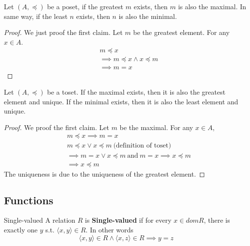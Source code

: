 \begin{proposition}{}{}
    Let $(A,\preceq)$ be a poset, if the greatest $m$ exists, then $m$
    is also the maximal. In same way, if the least $n$ exists, then $n$
    is also the minimal.
\end{proposition}

\begin{proof}
    We just proof the first claim. Let $m$ be the greatest element.
    For any $x \in A$.
    \begin{align*}
        &m \preceq x\\
        &\implies m \preceq x \land x \preceq m\\
        &\implies m = x
    \end{align*}
\end{proof}

\begin{theorem}{}{}
    Let $(A,\preceq)$ be a toset. If the maximal exists, then it is
    also the greatest element and unique.
    If the minimal exists, then it is also the least element and unique.
\end{theorem}

\begin{proof}
    We proof the first claim. Let $m$ be the maximal. For any $x \in A$,
    \begin{align*}
        &m \preceq x \implies m = x\\
        &m \preceq x \lor x \preceq m \ \text{(definition of toset)}\\
        &\implies m = x \lor x \preceq m \ \text{and}\  m = x
        \implies x \preceq m\\
        &\implies x \preceq m
    \end{align*}
    The uniqueness is due to the uniqueness of the greatest element.
\end{proof}

\subsection{Functions}

\begin{definition}{Single-valued}{}
    A relation $R$ is \textbf{Single-valued} if for every $x \in dom
    R$, there is exactly one $y$ s.t. $\langle x,y \rangle \in R$. In
    other words
    \begin{equation*}
        \langle x,y \rangle \in R \land \langle x,z \rangle \in R \implies y = z
    \end{equation*}
\end{definition}

